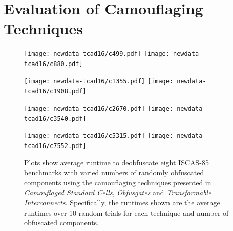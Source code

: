 \documentclass[thesis]{umassthesis}  %
\begin{document}








\section{Evaluation of Camouflaging Techniques}

\begin{figure}[!hbt]
  \centering
    \texttt{[image: newdata-tcad16/c499.pdf]} \hspace{.3cm}
    \texttt{[image: newdata-tcad16/c880.pdf]} 
    \vspace{-2mm}

    \texttt{[image: newdata-tcad16/c1355.pdf]} \hspace{.3cm}
    \texttt{[image: newdata-tcad16/c1908.pdf]} 
        \vspace{-2mm}

    \texttt{[image: newdata-tcad16/c2670.pdf]} \hspace{.3cm}
    \texttt{[image: newdata-tcad16/c3540.pdf]}
        \vspace{-2mm}

    \texttt{[image: newdata-tcad16/c5315.pdf]} \hspace{.3cm}
    \texttt{[image: newdata-tcad16/c7552.pdf]}

    \caption{Plots show average runtime to deobfuscate eight ISCAS-85 benchmarks with varied numbers of randomly obfuscated components using the camouflaging techniques presented in {\textit{Camouflaged Standard Cells}\cite{rajendran-13}, \textit{Obfusgates}\cite{malik-obfusgate} and \textit{Transformable Interconnects}\cite{chen-2015-dummyWire}}. Specifically, the runtimes shown are the average runtimes over 10 random trials for each technique and number of obfuscated components.}
    \label{fig:tcad16-comparison}
\end{figure}
\end{document}
